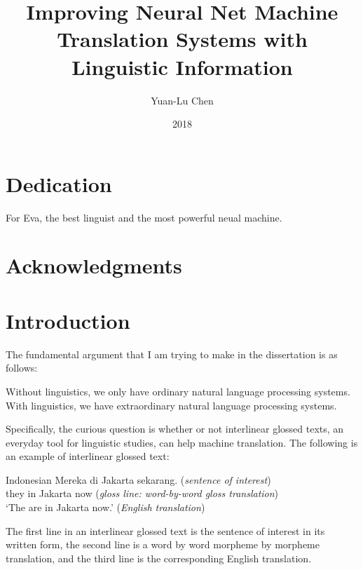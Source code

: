 \documentclass[final]{ua-thesis}
\author{Yuan-Lu Chen}
\title{Improving Neural Net Machine Translation Systems with Linguistic Information}
\date{2018}
\numberwithin{equation}{section}
\begin{document}


\maketitle

\chapter*{Dedication}
\thispagestyle{topright}
\begin{center}For Eva, the best linguist and the most powerful neual machine.\end{center}
\chapter*{Acknowledgments}


\tableofcontents
\listoffigures
\listoftables


%

\printindex

\chapter{Introduction}
\label{chap:Introduction}
\setcounter{exx}{0}
The fundamental argument that I am trying to make in the dissertation is as follows:

\begin{exe}
	\ex Without linguistics, we only have ordinary natural language processing systems. With linguistics, we have extraordinary natural language processing systems. 
\end{exe}

Specifically, the curious question is whether or not interlinear glossed texts, an everyday tool for linguistic studies, can help machine translation. 
The following is an example of interlinear glossed text:

\begin{exe}  
\ex\label{gloss_eg} Indonesian \citep[p. 237]{sneddon2012indonesian}
	\gll   Mereka di Jakarta sekarang. (\textit{sentence of interest})\\
     	   they in Jakarta now (\textit{gloss line: word-by-word gloss translation})\\
    \glt   `The are in Jakarta now.' (\textit{English translation})  
\end{exe}

The first line in an interlinear glossed text is the sentence of interest in its written form, the second line is a word by word morpheme by morpheme translation, and the third line is the corresponding English translation. 
\end{document}
